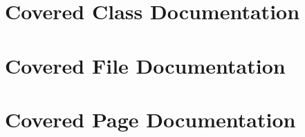 \documentclass[a4paper]{book}
\begin{document}
\chapter{Covered Class Documentation}





























\chapter{Covered File Documentation}
































































\chapter{Covered Page Documentation}









\printindex
\end{document}
